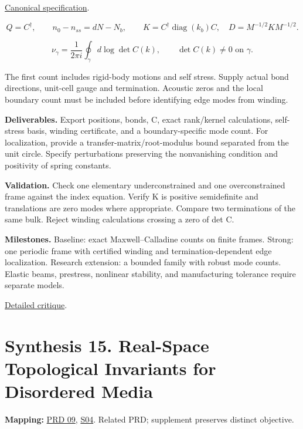 \documentclass[
  11pt,
]{article}
\begin{document}
\href{https://github.com/rick-stevens-ai/Pure-Thought/blob/main/PRDs/12-Topological-Mechanical-Metamaterials.md}{Canonical
specification}.

\[Q=C^\dagger,\qquad n_0-n_{ss}=dN-N_b,\qquad
K=C^\dagger\operatorname{diag}(k_b)C,\quad D=M^{-1/2}KM^{-1/2}.\]

\[\nu_\gamma=\frac1{2\pi i}\oint_\gamma d\log\det C(k),
\qquad \det C(k)\ne0\text{ on }\gamma.\]

The first count includes rigid-body motions and self stress. Supply
actual bond directions, unit-cell gauge and termination. Acoustic zeros
and the local boundary count must be included before identifying edge
modes from winding.

\textbf{Deliverables.} Export positions, bonds, C, exact rank/kernel
calculations, self-stress basis, winding certificate, and a
boundary-specific mode count. For localization, provide a
transfer-matrix/root-modulus bound separated from the unit circle.
Specify perturbations preserving the nonvanishing condition and
positivity of spring constants.

\textbf{Validation.} Check one elementary underconstrained and one
overconstrained frame against the index equation. Verify K is positive
semidefinite and translations are zero modes where appropriate. Compare
two terminations of the same bulk. Reject winding calculations crossing
a zero of det C.

\textbf{Milestones.} Baseline: exact Maxwell--Calladine counts on finite
frames. Strong: one periodic frame with certified winding and
termination-dependent edge localization. Research extension: a bounded
family with robust mode counts. Elastic beams, prestress, nonlinear
stability, and manufacturing tolerance require separate models.

\href{https://github.com/rick-stevens-ai/Pure-Thought/blob/main/reviews/12-Topological-Mechanical-Metamaterials.md}{Detailed
critique}.

\section{Synthesis 15. Real-Space Topological Invariants for Disordered
Media}

\textbf{Mapping:}
\href{https://github.com/rick-stevens-ai/Pure-Thought/blob/main/PRDs/09-Topological-Band-Theory.md}{PRD
09},
\href{https://github.com/rick-stevens-ai/Pure-Thought/blob/main/supplemental/S04.md}{S04}.
Related PRD; supplement preserves distinct objective.
\end{document}
